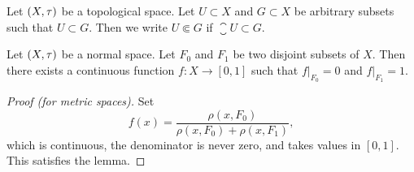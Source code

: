 
\lecture{}

\begin{definition}
Let $(X,\tau)$ be a topological space. Let $U\subset X$ and
$G\subset X$ be arbitrary subsets such that
$U\subset G$. Then we write $U\Subset G$ if $\closure{U}\subset G$.
\end{definition}

\begin{lemma}[Urysohn]
Let $(X,\tau)$ be a normal space. Let $F_{0}$ and $F_{1}$ be two
disjoint subsets of $X$. Then there exists a continuous function
$f\colon X\to[0,1]$ such that $f|_{F_{0}}=0$ and $f|_{F_{1}}=1$.
\end{lemma}

\begin{proof}[Proof (for metric spaces)]
Set
\begin{equation}
f(x)=\frac{\rho(x,F_{0})}{\rho(x,F_{0})+\rho(x,F_{1})},
\end{equation}
which is continuous, the denominator is never zero, and takes values
in $[0,1]$. This satisfies the lemma.
\end{proof}


